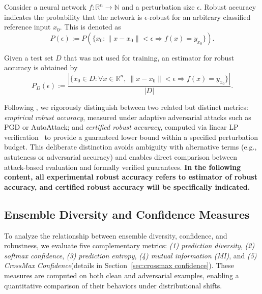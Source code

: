 \begin{definition}
Consider a neural network $f:\mathbb{R}^n \to \mathbb{N}$ and a perturbation size $\epsilon$. 
Robust accuracy indicates the probability that the network is $\epsilon$-robust for an arbitrary classified reference input $x_0$. 
This is denoted as
\begin{equation}
P(\epsilon) := P\left(\{x_0 : \|x - x_0\| < \epsilon \Rightarrow f(x) = y_{x_0}\}\right).
\end{equation}
\end{definition}

\begin{definition}
Given a test set $D$ that was not used for training, an estimator for robust accuracy is obtained by
\begin{equation}
P_D(\epsilon) := \frac{|\{x_0 \in D : \forall x \in \mathbb{R}^n,\ \|x - x_0\| < \epsilon \Rightarrow f(x) = y_{x_0}\}|}{|D|}.
\end{equation}
\end{definition}


Following \cite{kielhofer2025robustness}, we rigorously distinguish between two related but distinct metrics:  
\emph{empirical robust accuracy}, measured under adaptive adversarial attacks such as PGD or AutoAttack; and  
\emph{certified robust accuracy}, computed via linear LP verification~\cite{wong2018provable,gowal2018effectiveness} to provide a guaranteed lower bound within a specified perturbation budget.  
This deliberate distinction avoids ambiguity with alternative terms (e.g., astuteness or adversarial accuracy) and enables direct comparison between attack-based evaluation and formally verified guarantees. \textbf{In the following content, all experimental robust accuracy refers to estimator of robust accuracy, and certified robust accuracy will be specifically indicated.}

\subsection{Ensemble Diversity and Confidence Measures}
\label{sec:diversity-confidence}

\indent

To analyze the relationship between ensemble diversity, confidence, and robustness, we evaluate five complementary metrics:
\emph{(1) prediction diversity}, 
\emph{(2) softmax confidence}, 
\emph{(3) prediction entropy}, 
\emph{(4) mutual information (MI)}, 
and \emph{(5) CrossMax Confidence}(details in Section~\ref{sec:crossmax confidence}).
These measures are computed on both clean and adversarial examples, enabling a quantitative comparison of their behaviors under distributional shifts.

